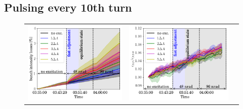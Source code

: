 \documentclass[
prstab
,reprint
,linenumbers
,longbibliography
,preprintnumbers
,showkeys
,amsfonts,amssymb,amsmath
,floatfix
]{revtex4-1}
\newlength{\thirdwidth}
\begin{document}
\subsection{Pulsing every 10th turn}
\label{sec:simex10}


\begin{figure}
  \begin{tabular}{ccc}
    \includegraphics[width=\thirdwidth]{2016_bunch_intensity_v10th_no_damper_avg.png}&
    \includegraphics[width=\thirdwidth]{2016_emith_avg_rel_v10th_no_damper.png}&

\end{tabular}
\end{figure}
\end{document}
